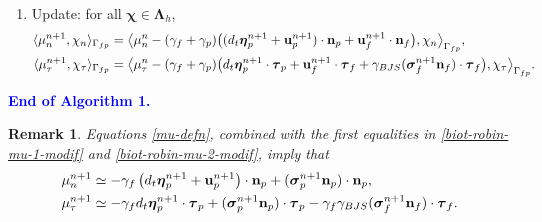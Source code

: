 \documentclass[11pt]{article}
\def\u{{\bf u}}
\def\n{{\bf n}}
\def\btau{\boldsymbol{\tau}}
\def\bbeta{\boldsymbol{\eta}}
\def\bs{\boldsymbol{\sigma}}
\def\bchi{\boldsymbol{\chi}}
\def\bL{\boldsymbol{\Lambda}}
\def\<{\langle}
\def\>{\rangle}
\def\dt{d_t}
\newtheorem{remark}{Remark}[section]
\begin{document}
\begin{enumerate}
\item Update: for all $\bchi \in \bL_h$,
%
\begin{subequations}\label{mu-defn}    
\begin{align}
  \<\mu_n^{n+1},\chi_n\>_{\Gamma_{fp}} & = \big\<\mu_n^n -(\gamma_f + \gamma_p)\big((\dt \bbeta_p^{n+1}
  + \u_p^{n+1})\cdot\n_p + \u_f^{n+1}\cdot\n_f\big),\chi_n\big\>_{\Gamma_{fp}},
  \label{mu-n-defn} \\
  \<\mu_{\tau}^{n+1},\chi_\tau\>_{\Gamma_{fp}}  & = \big\<\mu_{\tau}^n -(\gamma_f + \gamma_p)\big(
  \dt \bbeta_p^{n+1} \cdot\btau_p + \u_f^{n+1}\cdot\btau_f
  + \gamma_{BJS} (\bs_f^{n+1}\n_f)\cdot\btau_{f}\big),\chi_\tau\big\>_{\Gamma_{fp}}.
  \label{mu-t-defn} 
\end{align}
\end{subequations}

\end{enumerate}

\noindent
\textcolor{blue}{{\bf End of Algorithm 1.}}

\begin{remark}
Equations \eqref{mu-defn}, combined with the first equalities in \eqref{biot-robin-mu-1-modif} and \eqref{biot-robin-mu-2-modif}, imply that
%
\begin{subequations}\label{mu-approx-np1}    
  \begin{align}
     & \mu_n^{n+1} \simeq -\gamma_f \left(\dt \bbeta_p^{n+1} + \u_p^{n+1}\right)\cdot\n_p
  + (\bs_p^{n+1} \n_p)\cdot\n_p,
  \label{mun-approx-np1}\\
  & \mu_{\tau}^{n+1} \simeq  - \gamma_f \dt \bbeta_p^{n+1}\cdot\btau_{p}
  + (\bs_p^{n+1}\n_p)\cdot\btau_{p} - \gamma_f \gamma_{BJS} (\bs_f^{n+1}\n_f)\cdot\btau_{f}.
  \label{mut-approx-np1}
  \end{align}
\end{subequations}
%
\end{remark}
\end{document}
